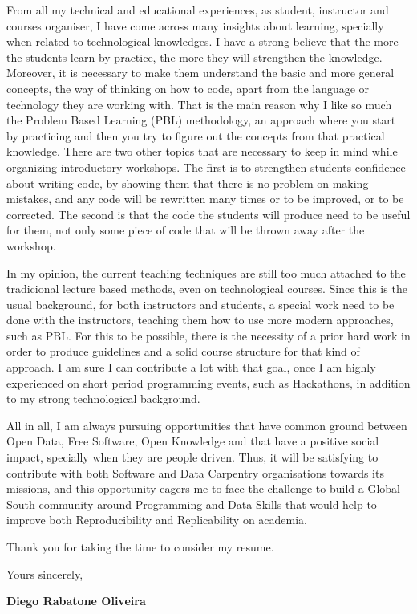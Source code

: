 \documentclass[11pt]{friggeri-cover-letter}
\begin{document}
From all my technical and educational experiences, as student, instructor and
courses organiser, I have come across many insights about learning, specially
when related to technological knowledges. I have a strong believe that the more
the students learn by practice, the more they will strengthen the knowledge.
Moreover, it is necessary to make them understand the basic and more general
concepts, the way of thinking on how to code, apart from the language or
technology they are working with. That is the main reason why I like so much
the Problem Based Learning (PBL) methodology, an approach where you start by
practicing and then you try to figure out the concepts from that practical
knowledge. There are two other topics that are necessary to keep in mind while
organizing introductory workshops. The first is to strengthen students
confidence about writing code, by showing them that there is no problem on
making mistakes, and any code will be rewritten many times \- or to be
improved, or to be corrected. The second is that the code the students will
produce need to be useful for them, not only some piece of code that will be
thrown away after the workshop.


In my opinion, the current teaching techniques are still too much attached to
the tradicional lecture based methods, even on technological courses. Since
this is the usual background, for both instructors and students, a special work
need to be done with the instructors, teaching them how to use more modern
approaches, such as PBL. For this to be possible, there is the necessity of a
prior hard work in order to produce guidelines and a solid course structure for
that kind of approach. I am sure I can contribute a lot with that goal, once I
am highly experienced on short period programming events, such as Hackathons,
in addition to my strong technological background.


All in all, I am always pursuing opportunities that have common ground between
Open Data, Free Software, Open Knowledge and that have a positive social
impact, specially when they are people driven. Thus, it will be satisfying to
contribute with both Software and Data Carpentry organisations towards its
missions, and this opportunity eagers me to face the challenge to build a
Global South community around Programming and Data Skills that would help to
improve both Reproducibility and Replicability on academia.

\vfill

Thank you for taking the time to consider my resume.

\vfill

\hfill Yours sincerely,

\hfill \textbf{Diego Rabatone Oliveira}

\vfill
\end{document}
